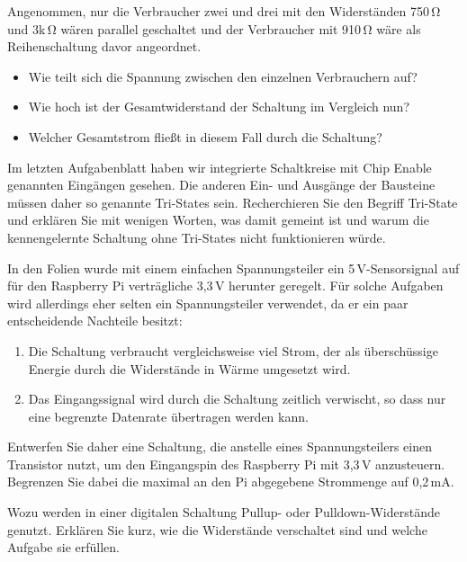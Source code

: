 \bigskip
\teilaufgabe
Angenommen, nur die Verbraucher zwei und drei mit den Widerständen 750\,\si{\ohm}
und 3k\,\si{\ohm} wären parallel geschaltet und der Verbraucher mit 910\,\si{\ohm}
wäre als Reihenschaltung davor angeordnet.

\begin{itemize}
    \item Wie teilt sich die Spannung zwischen den einzelnen Verbrauchern auf?
    \item Wie hoch ist der Gesamtwiderstand der Schaltung im Vergleich nun?
    \item Welcher Gesamtstrom fließt in diesem Fall durch die Schaltung?
\end{itemize}

\teilaufgabe
Im letzten Aufgabenblatt haben wir integrierte Schaltkreise mit \glqq{}Chip Enable\grqq{}
genannten Eingängen gesehen. Die anderen Ein- und Ausgänge der Bausteine müssen
daher so genannte \glqq{}Tri-States\grqq{} sein. Recherchieren Sie den Begriff
Tri-State und erklären Sie mit wenigen Worten, was damit gemeint ist und warum die
kennengelernte Schaltung ohne Tri-States nicht funktionieren würde.

\bigskip
\teilaufgabe
In den Folien wurde mit einem einfachen Spannungsteiler ein 5\,V-Sensorsignal
auf für den Raspberry Pi verträgliche 3,3\,V herunter geregelt. Für solche
Aufgaben wird allerdings eher selten ein Spannungsteiler verwendet, da er ein
paar entscheidende Nachteile besitzt:


\begin{enumerate}
    \item Die Schaltung verbraucht vergleichsweise viel Strom, der als überschüssige
    Energie durch die Widerstände in Wärme umgesetzt wird.

    \item Das Eingangssignal wird durch die Schaltung zeitlich verwischt, so dass
    nur eine begrenzte Datenrate übertragen werden kann.
\end{enumerate}

Entwerfen Sie daher eine Schaltung, die anstelle eines Spannungsteilers einen
Transistor nutzt, um den Eingangspin des Raspberry Pi mit 3,3\,V anzusteuern.
Begrenzen Sie dabei die maximal an den Pi abgegebene Strommenge auf 0,2\,mA.

\clearpage
\teilaufgabe
Wozu werden in einer digitalen Schaltung Pullup- oder Pulldown-Widerstände
genutzt. Erklären Sie kurz, wie die Widerstände verschaltet sind und welche
Aufgabe sie erfüllen.


